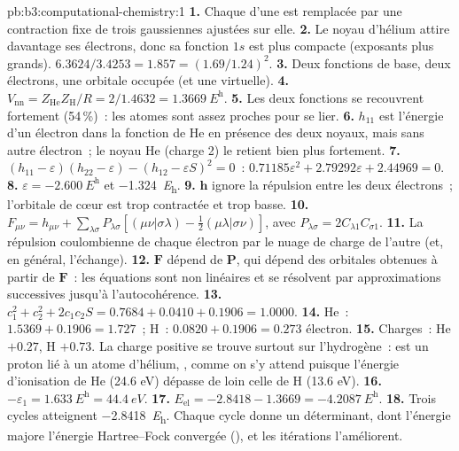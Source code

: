 \begin{solution}{pb:b3:computational-chemistry:1}
\textbf{1.} Chaque  d'une  est
remplacée par une contraction fixe de trois gaussiennes ajustées sur
elle.
\textbf{2.} Le noyau d'hélium attire davantage ses électrons, donc sa
fonction $1s$ est plus compacte (exposants plus grands). $6.3624/3.4253 = 1.857 = (1.69/1.24)^2$.
\textbf{3.} Deux fonctions de base, deux électrons, une orbitale occupée
(et une virtuelle).
\textbf{4.} $V_{\mathrm{nn}} = Z_{\mathrm{He}}Z_{\mathrm H}/R = 2/1.4632 =
\qty{1.3669}{\hartree}$.
\textbf{5.} Les deux fonctions se recouvrent fortement (54\,\%)~: les
atomes sont assez proches pour se lier.
\textbf{6.} $h_{11}$ est l'énergie d'un électron dans la fonction de He
en présence des deux noyaux, mais sans autre électron~; le noyau He
(charge 2) le retient bien plus fortement.
\textbf{7.} $(h_{11} - \varepsilon)(h_{22} - \varepsilon) - (h_{12} - \varepsilon S)^2 = 0$~:
$0.71185\varepsilon^2 + 2.79292\varepsilon + 2.44969 = 0$.
\textbf{8.} $\varepsilon = \qty{-2.600}{\hartree}$ et \qty{-1.324}{\hartree}.
\textbf{9.} $\mathbf h$ ignore la répulsion entre les deux électrons~;
l'orbitale de cœur est trop contractée et trop basse.
\textbf{10.} $F_{\mu\nu} = h_{\mu\nu} + \sum_{\lambda\sigma}P_{\lambda\sigma}[(\mu\nu|\sigma\lambda) -
\frac12(\mu\lambda|\sigma\nu)]$, avec $P_{\lambda\sigma} = 2C_{\lambda1}C_{\sigma1}$.
\textbf{11.} La répulsion coulombienne de chaque électron par le nuage de
charge de l'autre (et, en général, l'échange).
\textbf{12.} $\mathbf F$ dépend de $\mathbf P$, qui dépend des orbitales
obtenues à partir de $\mathbf F$~: les équations sont non linéaires et se
résolvent par approximations successives jusqu'à l'autocohérence.
\textbf{13.} $c_1^2 + c_2^2 + 2c_1c_2S = 0.7684 + 0.0410 + 0.1906 = 1.0000$.
\textbf{14.} He~: $1.5369 + 0.1906 = 1.727$~; H~: $0.0820 + 0.1906 = 0.273$
électron.
\textbf{15.} Charges~: He $+0.27$, H $+0.73$. La charge positive se trouve
surtout sur l'hydrogène~:  est un proton lié à un atome
d'hélium, , comme on s'y attend puisque l'énergie
d'ionisation de He (24.6 eV) dépasse de loin celle de H (13.6 eV).
\textbf{16.} $-\varepsilon_1 = \qty{1.633}{\hartree} = \qty{44.4}{eV}$.
\textbf{17.} $E_{\mathrm{el}} = -2.8418 - 1.3669 = \qty{-4.2087}{\hartree}$.
\textbf{18.} Trois cycles atteignent \qty{-2.8418}{\hartree}. Chaque cycle
donne un déterminant, dont l'énergie majore l'énergie Hartree--Fock
convergée (), et les itérations l'améliorent.

\end{solution}
